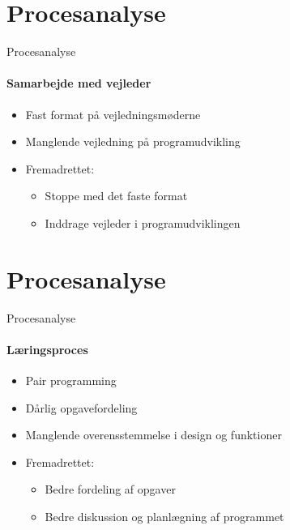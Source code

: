 \section{Procesanalyse}
\begin{frame}{Procesanalyse}
	\framesubtitle{Samarbejde med vejleder}
	
	\begin{itemize}
		\item Fast format på vejledningsmøderne
		\item Manglende vejledning på programudvikling
		\item Fremadrettet:
		\begin{itemize}
			\item Stoppe med det faste format
			\item Inddrage vejleder i programudviklingen
		\end{itemize}
	\end{itemize}

\end{frame}

\section{Procesanalyse}
\begin{frame}{Procesanalyse}
	\framesubtitle{Læringsproces}
	
	\begin{itemize}
		\item Pair programming
		\item Dårlig opgavefordeling
		\item Manglende overensstemmelse i design og funktioner
		\item Fremadrettet:
		\begin{itemize}
			\item Bedre fordeling af opgaver
			\item Bedre diskussion og planlægning af programmet
		\end{itemize}
	\end{itemize}

\end{frame}